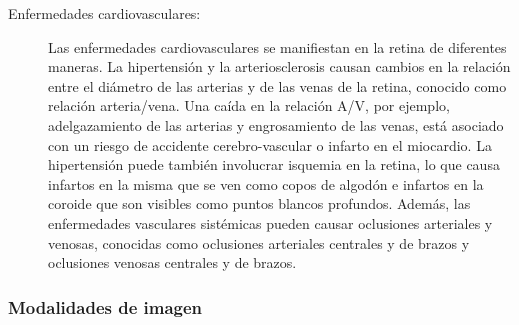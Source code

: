 \begin{description}
     \item[Enfermedades cardiovasculares:] Las enfermedades cardiovasculares se manifiestan en la retina de diferentes maneras. La hipertensión y la arteriosclerosis causan cambios en la relación entre el diámetro de las arterias y de las venas de la retina, conocido como relación arteria/vena. Una caída en la relación A/V, por ejemplo, adelgazamiento de las arterias y engrosamiento de las venas, está asociado con un riesgo de accidente cerebro-vascular o infarto en el miocardio. La hipertensión puede también involucrar isquemia en la retina, lo que causa infartos en la misma que se ven como copos de algodón e infartos en la coroide que son visibles como puntos blancos profundos. Además, las enfermedades vasculares sistémicas pueden causar oclusiones arteriales y venosas, conocidas como oclusiones arteriales centrales y de brazos y oclusiones venosas centrales y de brazos. \cite{fraz2012blood}
\end{description}
 
 
 
  
 

			\subsubsection{Modalidades de imagen}
			
	


